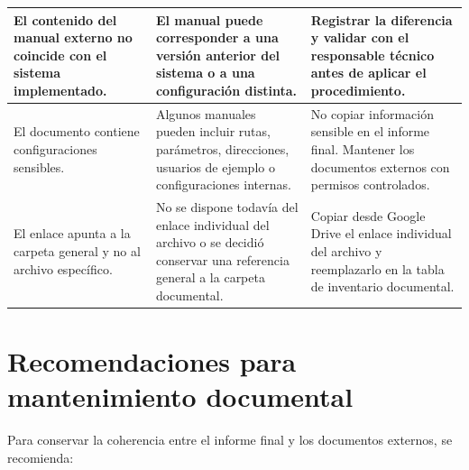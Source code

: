 \begin{longtable}{p{} p{} p{}}
\hline

El contenido del manual externo no coincide con el sistema implementado. &
El manual puede corresponder a una versión anterior del sistema o a una configuración distinta. &
Registrar la diferencia y validar con el responsable técnico antes de aplicar el procedimiento. \\

\hline

El documento contiene configuraciones sensibles. &
Algunos manuales pueden incluir rutas, parámetros, direcciones, usuarios de ejemplo o configuraciones internas. &
No copiar información sensible en el informe final. Mantener los documentos externos con permisos controlados. \\

\hline

El enlace apunta a la carpeta general y no al archivo específico. &
No se dispone todavía del enlace individual del archivo o se decidió conservar una referencia general a la carpeta documental. &
Copiar desde Google Drive el enlace individual del archivo y reemplazarlo en la tabla de inventario documental. \\

\hline

\end{longtable}

\section{Recomendaciones para mantenimiento documental}

Para conservar la coherencia entre el informe final y los documentos externos, se recomienda:


